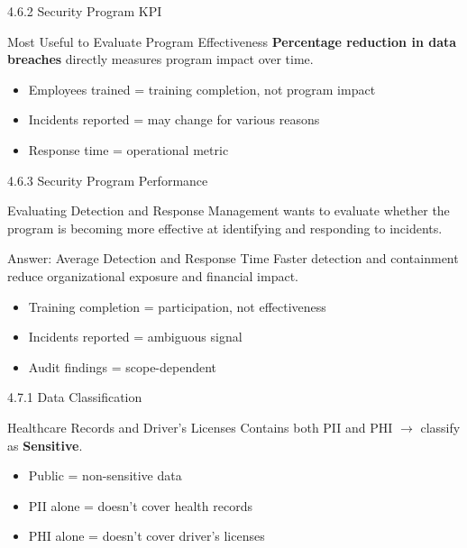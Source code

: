\documentclass{beamer}
\begin{document}
	\begin{frame}{4.6.2 Security Program KPI}
		\begin{block}{Most Useful to Evaluate Program Effectiveness}
			\textbf{Percentage reduction in data breaches} directly measures program impact over time.
		\end{block}
		\begin{itemize}
			\item Employees trained = training completion, not program impact
			\item Incidents reported = may change for various reasons
			\item Response time = operational metric
		\end{itemize}
	\end{frame}
	
	\begin{frame}{4.6.3 Security Program Performance}
		\begin{block}{Evaluating Detection and Response}
			Management wants to evaluate whether the program is becoming more effective at identifying and responding to incidents.
		\end{block}
		\begin{exampleblock}{Answer: Average Detection and Response Time}
			Faster detection and containment reduce organizational exposure and financial impact.
		\end{exampleblock}
		\begin{itemize}
			\item Training completion = participation, not effectiveness
			\item Incidents reported = ambiguous signal
			\item Audit findings = scope-dependent
		\end{itemize}
	\end{frame}
	
	\begin{frame}{4.7.1 Data Classification}
		\begin{block}{Healthcare Records and Driver's Licenses}
			Contains both PII and PHI $\rightarrow$ classify as \textbf{Sensitive}.
		\end{block}
		\begin{itemize}
			\item Public = non-sensitive data
			\item PII alone = doesn't cover health records
			\item PHI alone = doesn't cover driver's licenses
		\end{itemize}
	\end{frame}
	
\end{document}
